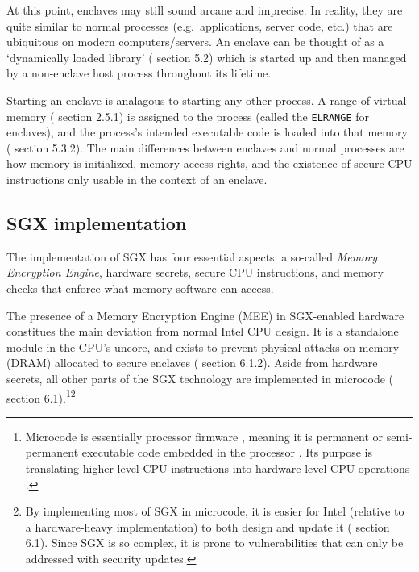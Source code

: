 At this point, enclaves may still sound arcane and imprecise. In reality, they are quite similar to normal processes (e.g.\ applications, server code, etc.) that are ubiquitous on modern computers/servers. An enclave can be thought of as a `dynamically loaded library' (\cite{intel-sgx-explained-advanced} section 5.2) which is started up and then managed by a non-enclave host process throughout its lifetime.

Starting an enclave is analagous to starting any other process. A range of virtual memory (\cite{intel-sgx-explained-advanced} section 2.5.1) is assigned to the process (called the {\tt ELRANGE} for enclaves), and the process's intended executable code is loaded into that memory (\cite{intel-sgx-explained-advanced} section 5.3.2). The main differences between enclaves and normal processes are how memory is initialized, memory access rights, and the existence of secure CPU instructions only usable in the context of an enclave.


\subsection{SGX implementation}
\label{subsec:enclaves-sgx-implementation}

The implementation of SGX has four essential aspects: a so-called {\em Memory Encryption Engine}, hardware secrets, secure CPU instructions, and memory checks that enforce what memory software can access.

The presence of a Memory Encryption Engine (MEE) \cite{memory-encryption-engine-general-purpose-processors} in SGX-enabled hardware constitues the main deviation from normal Intel CPU design. It is a standalone module in the CPU's uncore, and exists to prevent physical attacks on memory (DRAM) allocated to secure enclaves (\cite{intel-sgx-explained-advanced} section 6.1.2). Aside from hardware secrets, all other parts of the SGX technology are implemented in microcode (\cite{intel-sgx-explained-advanced} section 6.1).\footnote{Microcode is essentially processor firmware \cite{debian-wiki-microcode}, meaning it is permanent or semi-permanent executable code embedded in the processor \cite{simple-wiki-firmware}. Its purpose is translating higher level CPU instructions into hardware-level CPU operations \cite{microcode-vs-firmware}.}\footnote{By implementing most of SGX in microcode, it is easier for Intel (relative to a hardware-heavy implementation) to both design and update it (\cite{intel-sgx-explained-advanced} section 6.1). Since SGX is so complex, it is prone to vulnerabilities \cite{wiki-sgx-attacks} that can only be addressed with security updates.}

